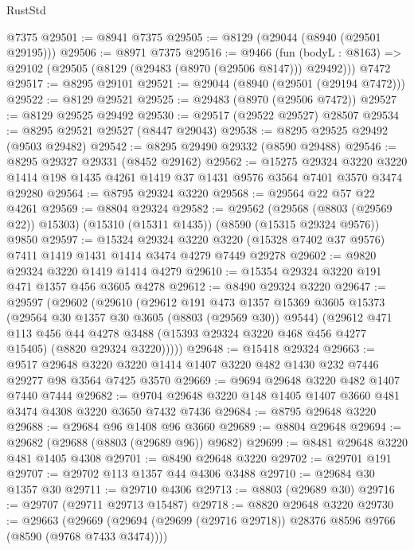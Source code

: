 \begin{lexlean}{RustStd}
\begin{coremodule}
    @7375
@29501 := @8941 @7375
@29505 := @8129 (@29044 (@8940 (@29501 @29195)))
@29506 := @8971 @7375
@29516 := @9466
    (fun (bodyL : @8163) => @29102 (@29505 (@8129 (@29483 (@8970 (@29506 @8147))) @29492)))
    @7472
@29517 := @8295 @29101
@29521 := @29044 (@8940 (@29501 (@29194 @7472)))
@29522 := @8129 @29521
@29525 := @29483 (@8970 (@29506 @7472))
@29527 := @8129 @29525 @29492
@29530 := @29517 (@29522 @29527) @28507
@29534 := @8295 @29521 @29527 (@8447 @29043)
@29538 := @8295 @29525 @29492 (@9503 @29482)
@29542 := @8295 @29490 @29332 (@8590 @29488)
@29546 := @8295 @29327 @29331 (@8452 @29162)
@29562 := @15275
    @29324
    @3220
    @3220
    @1414
    @198
    @1435
    @4261
    @1419
    @37
    @1431
    @9576
    @3564
    @7401
    @3570
    @3474
    @29280
@29564 := @8795 @29324 @3220
@29568 := @29564 @22 @57 @22 @4261
@29569 := @8804 @29324
@29582 := @29562
    (@29568 (@8803 (@29569 @22)) @15303)
    (@15310 (@15311 @1435))
    (@8590 (@15315 @29324 @9576))
    @9850
@29597 := @15324
    @29324
    @3220
    @3220
    (@15328 @7402 @37 @9576)
    @7411
    @1419
    @1431
    @1414
    @3474
    @4279
    @7449
    @29278
@29602 := @9820 @29324 @3220 @1419 @1414 @4279
@29610 := @15354 @29324 @3220 @191 @471 @1357 @456 @3605 @4278
@29612 := @8490 @29324 @3220
@29647 := @29597
    (@29602
      (@29610
        (@29612
          @191
          @473
          @1357
          @15369
          @3605
          @15373
          (@29564 @30 @1357 @30 @3605 (@8803 (@29569 @30)) @9544)
          (@29612
            @471
            @113
            @456
            @44
            @4278
            @3488
            (@15393 @29324 @3220 @468 @456 @4277 @15405)
            (@8820 @29324 @3220)))))
@29648 := @15418 @29324
@29663 := @9517
    @29648
    @3220
    @3220
    @1414
    @1407
    @3220
    @482
    @1430
    @232
    @7446
    @29277
    @98
    @3564
    @7425
    @3570
@29669 := @9694 @29648 @3220 @482 @1407 @7440 @7444
@29682 := @9704 @29648 @3220 @148 @1405 @1407 @3660 @481 @3474 @4308 @3220 @3650 @7432 @7436
@29684 := @8795 @29648 @3220
@29688 := @29684 @96 @1408 @96 @3660
@29689 := @8804 @29648
@29694 := @29682 (@29688 (@8803 (@29689 @96)) @9682)
@29699 := @8481 @29648 @3220 @481 @1405 @4308
@29701 := @8490 @29648 @3220
@29702 := @29701 @191
@29707 := @29702 @113 @1357 @44 @4306 @3488
@29710 := @29684 @30 @1357 @30
@29711 := @29710 @4306
@29713 := @8803 (@29689 @30)
@29716 := @29707 (@29711 @29713 @15487)
@29718 := @8820 @29648 @3220
@29730 := @29663
    (@29669 (@29694 (@29699 (@29716 @29718)) @28376 @8596 @9766 (@8590 (@9768 @7433 @3474))))

\end{coremodule}
\end{lexlean}
